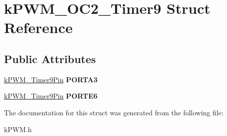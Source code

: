 \hypertarget{structkPWM__OC2__Timer9}{}\section{k\+P\+W\+M\+\_\+\+O\+C2\+\_\+\+Timer9 Struct Reference}
\label{structkPWM__OC2__Timer9}
\subsection*{Public Attributes}
\begin{DoxyCompactItemize}
\item 
\hyperlink{structkPWM__Timer9Pin}{k\+P\+W\+M\+\_\+\+Timer9\+Pin} {\bfseries P\+O\+R\+T\+A3}\hypertarget{structkPWM__OC2__Timer9_aedeb31c0da8e1aff0f39529c777186c1}{}\label{structkPWM__OC2__Timer9_aedeb31c0da8e1aff0f39529c777186c1}

\item 
\hyperlink{structkPWM__Timer9Pin}{k\+P\+W\+M\+\_\+\+Timer9\+Pin} {\bfseries P\+O\+R\+T\+E6}\hypertarget{structkPWM__OC2__Timer9_a5aba392fd17656a84c58429b1cd19c00}{}\label{structkPWM__OC2__Timer9_a5aba392fd17656a84c58429b1cd19c00}

\end{DoxyCompactItemize}


The documentation for this struct was generated from the following file\+:\begin{DoxyCompactItemize}
\item 
k\+P\+W\+M.\+h\end{DoxyCompactItemize}
